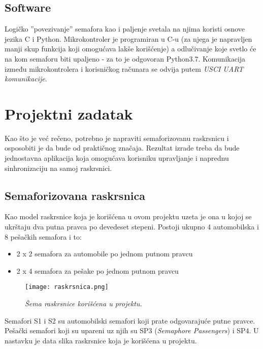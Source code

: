 \documentclass[a4paper,12pt, projekat]{etf}
\begin{document}
\section{Software}
Logičko ''povezivanje'' semafora kao i paljenje svetala na njima koristi osnove jezika C i Python. Mikrokontroler je programiran u C-u (za njega je napravljen manji skup funkcija koji omogućava lakše korišćenje) a odlučivanje koje svetlo će na kom semaforu biti upaljeno - za to je odgovoran Python3.7. Komunikacija između mikrokontrolera i korisničkog računara se odvija putem \textit{USCI UART komunikacije}.

\chapter{Projektni zadatak}
Kao što je već rečeno, potrebno je napraviti semaforizovanu raskrsnicu i osposobiti je da bude od praktičnog značaja. Rezultat izrade treba da bude jednostavna aplikacija koja omogućava korisniku upravljanje i naprednu sinhronizaciju na samoj raskrsnici.

\section{Semaforizovana raskrsnica}
Kao model raskrsnice koja je korišćena u ovom projektu uzeta je ona u kojoj se ukrštaju dva putna pravca po devedeset stepeni. Postoji ukupno 4 automobilska i 8 pešačkih semafora i to:
\begin{itemize}
  \item 2 x 2 semafora za automobile po jednom putnom pravcu
  \item 2 x 4 semafora za pešake po jednom putnom pravcu
\end{itemize}

\begin{figure}[!htb]
\centering
\texttt{[image: raskrsnica.png]}
\caption{\textit{Šema raskrsnice korišćena u projektu.}}
\label{fig:intersectionschema}
\end{figure}


Semafori S1 i S2 su automobilski semafori koji prate odgovarajuće putne pravce. Pešački semafori koji su upareni uz njih su SP3 (\textit{Semaphore Passengers}) i SP4. U nastavku je data slika raskrsnice koja je korišćena u projektu.
\\
\\
\\
\\
\\
\\
\\
\end{document}
